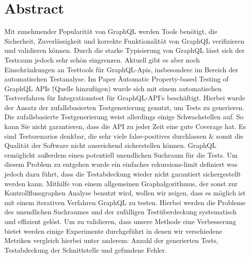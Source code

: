 \chapter{Abstract}

Mit zunehmender Popularität von GraphQL werden Tools benötigt, die Sicherheit, Zuverlässigkeit und korrekte Funktionalität
von GraphQL verifizieren und validieren können.
Durch die starke Typisierung von GraphQL lässt sich der Testraum jedoch sehr schön eingrenzen.
Aktuell gibt es aber noch Einschränkungen an Testtools für GraphQL-Apis, insbesondere im Bereich der automatischen Testanalyse.
Im Paper \" Automatic Property-based Testing of GraphQL APIs \" (Quelle hinzufügen) wurde sich mit einem automatischen
Testverfahren für Integrationstest für GraphQL-API's beschäftigt.
Hierbei wurde der Ansatz der zufallsbasierten Testgenerierung genutzt, um Tests zu generieren.
Die zufallsbasierte Testgenerierung weist allerdings einige Schwachstellen auf.
So kann Sie nicht garantieren, dass die API zu jeder Zeit eine gute Coverage hat.
Es sind Testszenarios denkbar, die sehr viele false-positives durchlassen \& somit die Qualität der Software nicht ausreichend sicherstellen können.
GraphQL ermöglicht außerdem einen potentiell unendlichen Suchraum für die Tests.
Um diesem Problem zu entgehen wurde ein einfaches rekursions-limit definiert was jedoch dazu führt, dass die Testabdeckung
wieder nicht garantiert sichergestellt werden kann.
Mithilfe von einem allgemeinen Graphalgorithmus, der sonst zur Kontrollflussgraphen Analyse benutzt wird, wollen wir zeigen,
dass es möglich ist mit einem iterativen Verfahren GraphQL zu testen.
Hierbei werden die Probleme des unendlichen Suchraumes und der zufälligen Testüberdeckung systematisch und effizient gelöst.
Um zu validieren, dass unsere Methode eine Verbesserung bietet werden einige Experimente durchgeführt in denen wir
verschiedene Metriken vergleich hierbei unter anderem: Anzahl der generierten Tests, Testabdeckung der Schnittstelle und
gefundene Fehler.






